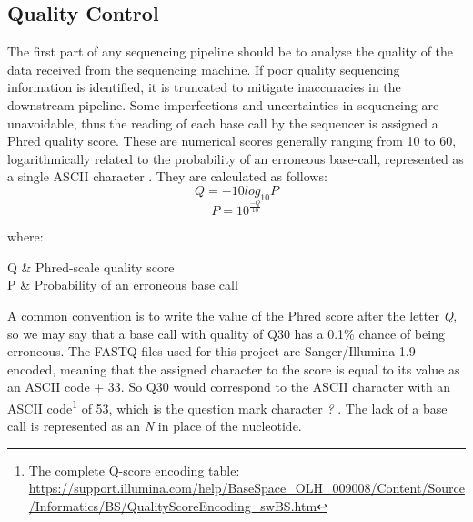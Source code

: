 \subsection{Quality Control}

The first part of any sequencing pipeline should be to analyse the quality of the data received from the sequencing machine. If poor quality sequencing information is identified, it is truncated to mitigate inaccuracies in the downstream pipeline. Some imperfections and uncertainties in sequencing are unavoidable, thus the reading of each base call by the sequencer is assigned a Phred quality score. These are numerical scores generally ranging from 10 to 60, logarithmically related to the probability of an erroneous base-call, represented as a single ASCII character \citep{ewing1998base}. They are calculated as follows:
$$ Q = -10 log_{10}P $$
 $$P = 10^{\frac{-Q}{10}}$$
 
where:
\begin{conditionsenv*}
	Q 		& Phred-scale quality score \\
	P 		& Probability of an erroneous base call \\
\end{conditionsenv*}

A common convention is to write the value of the Phred score after the letter \textit{Q}, so we may say that a base call with quality of Q30 has a 0.1\% chance of being erroneous. The FASTQ files used for this project are Sanger/Illumina 1.9 encoded, meaning that the assigned character to the score is equal to its value as an ASCII code + 33. So Q30 would correspond to the ASCII character with an ASCII code\footnote{The complete Q-score encoding table: \url{https://support.illumina.com/help/BaseSpace_OLH_009008/Content/Source/Informatics/BS/QualityScoreEncoding_swBS.htm}} of 53, which is the question mark character \textit{?} \citep{ewing1998base}. The lack of a base call is represented as an \textit{N} in place of the nucleotide.


